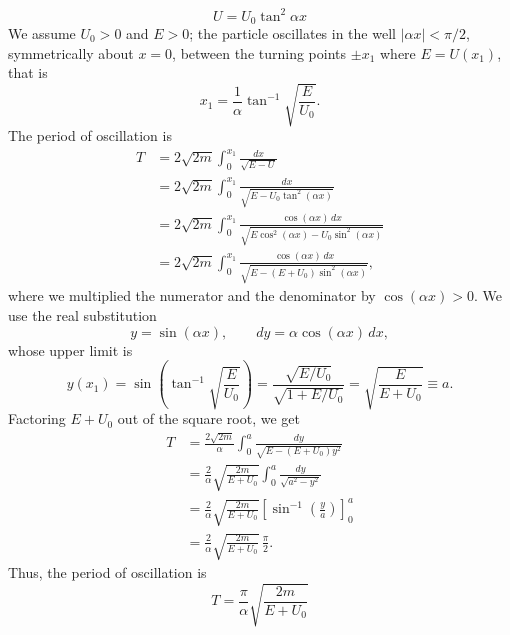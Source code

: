 \begin{subproblem}
{
\begin{equation*}
    U=U_0\tan^2{\alpha x}
\end{equation*}
}
{
We assume $U_0>0$ and $E>0$; the particle oscillates in the well $|\alpha x|<\pi/2$, symmetrically about $x=0$, between the turning points $\pm x_1$ where $E = U(x_1)$, that is
\begin{equation*}
    x_1 = \frac{1}{\alpha} \tan^{-1}{\sqrt{\frac{E}{U_0}}}.
\end{equation*}
The period of oscillation is
\begin{align*}
    T &= 2 \sqrt{2m} \int_0^{x_1} \frac{dx}{\sqrt{E-U}} \\
    &= 2 \sqrt{2m} \int_0^{x_1} \frac{dx}{\sqrt{E-U_0\tan^2{(\alpha x)}}} \\
    &= 2 \sqrt{2m} \int_0^{x_1} \frac{\cos{(\alpha x)}\,dx}{\sqrt{E\cos^2{(\alpha x)}-U_0\sin^2{(\alpha x)}}} \\
    &= 2 \sqrt{2m} \int_0^{x_1} \frac{\cos{(\alpha x)}\,dx}{\sqrt{E-(E+U_0)\sin^2{(\alpha x)}}},
\end{align*}
where we multiplied the numerator and the denominator by $\cos{(\alpha x)}>0$. We use the real substitution
\begin{equation*}
    y=\sin{(\alpha x)}, \qquad dy = \alpha\cos{(\alpha x)}\,dx,
\end{equation*}
whose upper limit is
\begin{equation*}
    y(x_1) = \sin{\left(\tan^{-1}{\sqrt{\frac{E}{U_0}}}\right)} = \frac{\sqrt{E/U_0}}{\sqrt{1+E/U_0}} = \sqrt{\frac{E}{E+U_0}} \equiv a .
\end{equation*}
Factoring $E+U_0$ out of the square root, we get
\begin{align*}
    T &= \frac{2\sqrt{2m}}{\alpha} \int_0^{a} \frac{dy}{\sqrt{E-\left( E+U_0 \right)y^2}} \\
    &=  \frac{2}{\alpha}\sqrt{\frac{2m}{E+U_0}} \int_0^{a} \frac{dy}{\sqrt{a^2-y^2}} \\
    &= \frac{2}{\alpha}\sqrt{\frac{2m}{E+U_0}} \left[\sin^{-1}{\left(\frac{y}{a}\right)}\right]_0^a \\
    &= \frac{2}{\alpha}\sqrt{\frac{2m}{E+U_0}}\,\frac{\pi}{2}.
\end{align*}
Thus, the period of oscillation is
}
{
\begin{equation*}
    T=\frac{\pi}{\alpha}\sqrt{\frac{2m}{E+U_0}}
\end{equation*}
}
\end{subproblem}


